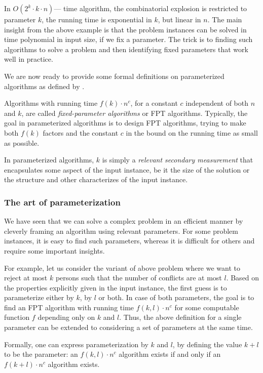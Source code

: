 In $O(2^k \cdot k \cdot n)$--- time algorithm, the combinatorial explosion is restricted to parameter $k$,
the running time is exponential in $k$, but linear in $n$.
The main insight from the above example is that the problem instances can be solved in time polynomial in input size, if we fix a parameter. 
The trick is to finding such algorithms to solve a problem and then identifying fixed parameters that work well in practice. 

We are now ready to provide some formal definitions on parameterized algorithms as defined by \cite{cygan2015parameterized}.

\begin{definition}
 Algorithms with running time $f(k)\cdot n^c$, for a constant $c$ independent of both $n$ and $k$, are called \textit{fixed-parameter algorithms} or FPT algorithms.
 Typically, the goal in parameterized algorithms is to design FPT algorithms, trying to make both $f(k)$ factors 
 and the constant $c$ in the bound on the running time as small as possible. 
 \end{definition}
 
 In parameterized algorithms, $k$ is simply a \textit{relevant secondary measurement} 
 that encapsulates some aspect of the input instance, be it the size of the solution or the structure and other characterizes of the input instance.


\subsubsection{The art of parameterization}
We have seen that we can solve a complex problem in an efficient manner by cleverly framing an algorithm using relevant parameters.
For some problem instances, it is easy to find such parameters, whereas it is difficult for others and require some important insights.

For example, let us consider the variant of above problem where we want to reject at most $k$ persons
such that the number of conflicts are at most $l$.
Based on the properties explicitly given in the input instance, the first guess is to parameterize either by $k$, by $l$ or both. 
In case of both parameters, the goal is to find an FPT algorithm with running time $f(k,l) \cdot n^c$ for some computable function $f$
depending only on $k$ and $l$. Thus, the above definition for a single parameter can be extended to considering a set of parameters at the same time.

\begin{definition}
Formally, one can express parameterization by $k$ and $l$, by defining the value $k+l$ to be the parameter:
an $f(k,l)\cdot n^c$ algorithm exists if and only if an $f(k+l) \cdot n^c$ algorithm exists.
\end{definition}

